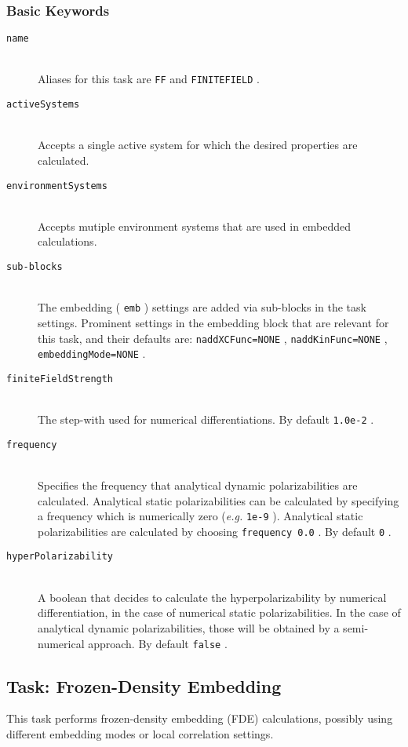 \documentclass[bibliography=totocnumbered,a4paper,10pt,oneside]{scrbook}
\newcommand{\ttt}[1]{%
  \begingroup\setlength{\fboxsep}{1pt}%
  \colorbox{serenity-green!30}{\texttt{\hspace*{2pt}\vphantom{(g}#1\hspace*{2pt}}}%
  \endgroup
}
\begin{document}
\subsubsection{Basic Keywords}
\begin{description}
	\item [\texttt{name}]\hfill \\
	Aliases for this task are \ttt{FF} and \ttt{FINITEFIELD}.
	\item [\texttt{activeSystems}]\hfill \\
	Accepts a single active system for which the desired properties are calculated.
	\item [\texttt{environmentSystems}]\hfill \\
	Accepts mutiple environment systems that are used in embedded calculations.
	\item [\texttt{sub-blocks}]\hfill \\
	The embedding (\ttt{emb}) settings are added via sub-blocks in the task settings.
	Prominent settings in the embedding block that are relevant for this task, and their defaults are:
	\ttt{naddXCFunc=NONE}, \ttt{naddKinFunc=NONE}, \ttt{embeddingMode=NONE}.
    \item [\texttt{finiteFieldStrength}]\hfill \\
    The step-with used for numerical differentiations. By default \ttt{1.0e-2}.
    \item [\texttt{frequency}]\hfill \\
    Specifies the frequency that analytical dynamic polarizabilities are calculated. Analytical static polarizabilities
    can be calculated by specifying a frequency which is numerically zero (\emph{e.g.} \ttt{1e-9}). Analytical static polarizabilities
    are calculated by choosing \ttt{frequency 0.0}. By default \ttt{0}.
    \item [\texttt{hyperPolarizability}]\hfill \\
    A boolean that decides to calculate the hyperpolarizability by numerical differentiation, in the case of numerical static polarizabilities. In the case of analytical dynamic polarizabilities, those will be obtained by a semi-numerical approach. By default \ttt{false}.
\end{description}


\subsection{Task: Frozen-Density Embedding}
\label{sec:FDE}
This task performs frozen-density embedding (FDE) calculations, possibly using different embedding modes or local correlation settings.
\end{document}
